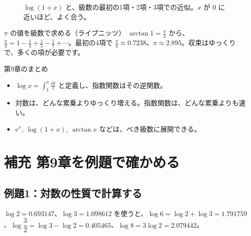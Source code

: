 \documentclass[a4paper,11pt,openany]{ltjsbook}
\newcommand{\dd}{\mathrm{d}}
\newcommand{\ee}{\mathrm{e}}
\begin{document}
\begin{figure}[htbp]
\centering
{}
\caption{$\log(1+x)$ と、級数の最初の1項・2項・3項での近似。$x$ が $0$ に近いほど、よく合う。}
\end{figure}

\begin{examplebox}{$\pi$ の値を級数で求める（ライプニッツ）}
$\arctan1=\frac\pi4$ から、$\frac\pi4=1-\frac13+\frac15-\frac17+\cdots$。最初の4項で $\frac\pi4\approx0.7238$、$\pi\approx2.895$。収束はゆっくりで、多くの項が必要です。
\end{examplebox}

\begin{pointbox}{第9章のまとめ}
\begin{itemize}[leftmargin=1.5em]
\item $\log x=\int_1^x\frac{\dd t}{t}$ と定義し、指数関数はその逆関数。
\item 対数は、どんな累乗よりゆっくり増える。指数関数は、どんな累乗よりも速い。
\item $\ee^x,\ \log(1+x),\ \arctan x$ などは、べき級数に展開できる。
\end{itemize}
\end{pointbox}

\section{補充 第9章を例題で確かめる}

\subsection*{例題1：対数の性質で計算する}

$\log2=0.693147$、$\log3=1.098612$ を使うと、$\log6=\log2+\log3=1.791759$、$\log\dfrac32=\log3-\log2=0.405465$、$\log8=3\log2=2.079442$。
\end{document}
